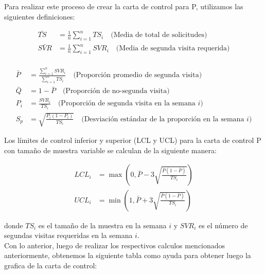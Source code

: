 \documentclass{article}
\begin{document}
Para realizar este proceso de crear la carta de control para P, utilizamos las siguientes definiciones:

\begin{align*}
    \bar{TS} &= \frac{1}{n} \sum_{i=1}^{n} TS_i \quad \text{(Media de total de solicitudes)} \\
    \bar{SVR} &= \frac{1}{n} \sum_{i=1}^{n} SVR_i \quad \text{(Media de segunda visita requerida)} \\
\end{align*}

\begin{align*}
    \bar{P} &= \frac{\sum_{i=1}^{n} SVR_i}{\sum_{i=1}^{n} TS_i} \quad \text{(Proporción promedio de segunda visita)} \\
    \bar{Q} &= 1 - \bar{P} \quad \text{(Proporción de no-segunda visita)} \\
    P_i &= \frac{SVR_i}{TS_i} \quad \text{(Proporción de segunda visita en la semana } i\text{)} \\
    S_p &= \sqrt{\frac{P_i (1 - P_i)}{TS_i}} \quad \text{(Desviación estándar de la proporción en la semana } i\text{)}
\end{align*}

Los límites de control inferior y superior (LCL y UCL) para la carta de control P con tamaño de muestra variable se calculan de la siguiente manera:

\begin{align*}
    LCL_i &= \max\left(0, \bar{P} - 3 \sqrt{\frac{\bar{P} (1 - \bar{P})}{TS_i}}\right) \\
    UCL_i &= \min\left(1, \bar{P} + 3 \sqrt{\frac{\bar{P} (1 - \bar{P})}{TS_i}}\right)
\end{align*}

donde $TS_i$ es el tamaño de la muestra en la semana $i$ y $SVR_i$ es el número de segundas visitas requeridas en la semana $i$.\\

Con lo anterior, luego de realizar los respectivos calculos mencionados anteriormente, obtenemos la siguiente tabla como ayuda para obtener luego la grafica de la carta de control: \\
\end{document}
